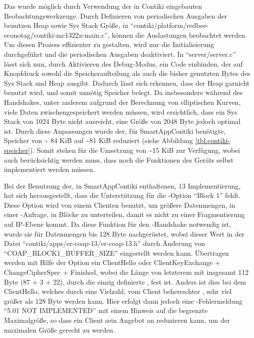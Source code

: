 Das wurde möglich durch Verwendung der in Contiki eingebauten Beobachtungswerkzeuge. Durch Definieren von periodischen Ausgaben der benutzen Heap
sowie Sys Stack Größe, in "`contiki/platform/redbee-econotag/contiki-mc1322x-main.c"', können die Auslastungen beobachtet werden. Um diesen Prozess
effizienter zu gestalten, wird nur die Initialisierung durchgeführt und die periodischen Ausgaben deaktiviert. In "`server/server.c"' lässt sich nun,
durch Aktivieren des Debug-Modus, ein Code einbinden, der auf Knopfdruck sowohl die Speicheraufteilung als auch die bisher genutzten Bytes des Sys Stack
und Heap ausgibt. Dadurch lässt sich erkennen, dass der Heap garnicht benutzt wird, und somit unnötig Speicher belegt. Da insbesondere während des Handshakes,
unter anderem aufgrund der Berechnung von elliptischen Kurven, viele Daten zwischengespeichert werden müssen, wird ersichtlich, dass ein Sys Stack von 1024
Byte nicht ausreicht, eine Größe von 2048 Byte jedoch optimal ist. Durch diese Anpassungen wurde der, für SmartAppContiki benötigte, Speicher von \textasciitilde
84 KiB auf \textasciitilde 81 KiB reduziert (siehe Abbildung \ref{tbl:contiki-speicher}). Somit stehen für die Umsetzung von  \textasciitilde 15 KiB zur
Verfügung, wobei auch berücksichtig werden muss, dass noch die Funktionen des Geräts selbst implementiert werden müssen.

Bei der Benutzung der, in SmartAppContiki enthaltenen,  13 Implementierung, hat sich herausgestellt, dass die Unterstützung für die -Option
"`Block 1"' fehlt. Diese Option wird von einem Clienten benutzt, um größere Datenmengen, in einer -Anfrage, in Blöcke zu unterteilen, damit es nicht
zu einer Fragmentierung auf IP-Ebene kommt. Da diese Funktion für den -Handshake notwendig ist, wurde sie für Datenmengen bis 128 Byte nachgerüstet,
wobei dieser Wert in der Datei "`contiki/apps/er-coap-13/er-coap-13.h"' durch Änderung von "`COAP\_BLOCK1\_BUFFER\_SIZE"' eingestellt werden kann. Übertragen
werden mit Hilfe der Option ein ClientHello oder ClientKeyExchange + ChangeCipherSpec + Finished, wobei die Länge von letzterem mit insgesamt 112 Byte
(87 + 3 + 22), durch die einzig definierte , fest ist. Anders ist dies bei dem ClientHello, welches durch eine Vielzahl, vom Client beherrschter
, sehr viel größer als 128 Byte werden kann. Hier erfolgt dann jedoch eine -Fehlermeldung "`5.01 NOT IMPLEMENTED"' mit einem
Hinweis auf die begrenzte Maximalgröße, so dass ein Client sein Angebot an  reduzieren kann, um der maximalen Größe gerecht zu werden.

